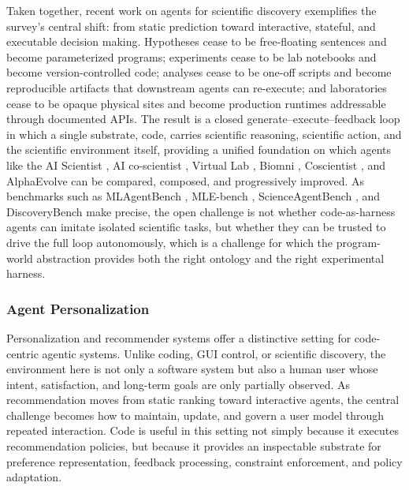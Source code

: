 \documentclass{llmxive}
\begin{document}
Taken together, recent work on agents for scientific discovery exemplifies the survey's central shift: from static prediction toward interactive, stateful, and executable decision making. Hypotheses cease to be free-floating sentences and become parameterized programs; experiments cease to be lab notebooks and become version-controlled code; analyses cease to be one-off scripts and become reproducible artifacts that downstream agents can re-execute; and laboratories cease to be opaque physical sites and become production runtimes addressable through documented APIs. The result is a closed generate–execute–feedback loop in which a single substrate, code, carries scientific reasoning, scientific action, and the scientific environment itself, providing a unified foundation on which agents like the AI Scientist \citep{lu2024aiscientistfullyautomated,yamada2025aiscientistv2workshoplevelautomated}, AI co-scientist \citep{gottweis2025aicoscientist}, Virtual Lab \citep{swanson2025virtual}, Biomni \citep{huang2025biomni}, Coscientist \citep{boiko2023autonomous}, and AlphaEvolve \citep{novikov2025alphaevolvecodingagentscientific} can be compared, composed, and progressively improved. As benchmarks such as MLAgentBench \citep{huang2024mlagentbenchevaluatinglanguageagents}, MLE-bench \citep{chan2025mlebenchevaluatingmachinelearning}, ScienceAgentBench \citep{chen2025scienceagentbenchrigorousassessmentlanguage}, and DiscoveryBench \citep{majumder2024discoverybenchdatadrivendiscoverylarge} make precise, the open challenge is not whether code-as-harness agents can imitate isolated scientific tasks, but whether they can be trusted to drive the full loop autonomously, which is a challenge for which the program-world abstraction provides both the right ontology and the right experimental harness.

\subsubsection{Agent Personalization}

Personalization and recommender systems offer a distinctive setting for code-centric agentic systems. Unlike coding, GUI control, or scientific discovery, the environment here is not only a software system but also a human user whose intent, satisfaction, and long-term goals are only partially observed. As recommendation moves from static ranking toward interactive agents, the central challenge becomes how to maintain, update, and govern a user model through repeated interaction. Code is useful in this setting not simply because it executes recommendation policies, but because it provides an inspectable substrate for preference representation, feedback processing, constraint enforcement, and policy adaptation.
\end{document}
